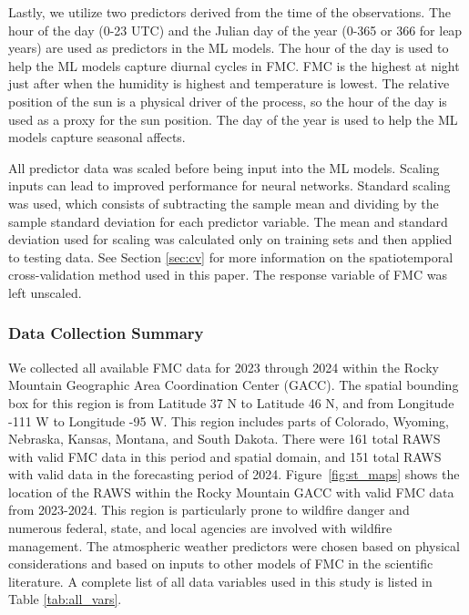 \documentclass[fire,article,submit,pdftex,moreauthors]{Definitions/mdpi}
\begin{document}
Lastly, we utilize two predictors derived from the time of the observations. The hour of the day (0-23 UTC) and the Julian day of the year (0-365 or 366 for leap years) are used as predictors in the ML models. The hour of the day is used to help the ML models capture diurnal cycles in FMC. FMC is the highest at night just after when the humidity is highest and temperature is lowest. The relative position of the sun is a physical driver of the process, so the hour of the day is used as a proxy for the sun position. The day of the year is used to help the ML models capture seasonal affects.

All predictor data was scaled before being input into the ML models. Scaling inputs can lead to improved performance for neural networks. Standard scaling was used, which consists of subtracting the sample mean and dividing by the sample standard deviation for each predictor variable. The mean and standard deviation used for scaling was calculated only on training sets and then applied to testing data. See Section \ref{sec:cv} for more information on the spatiotemporal cross-validation method used in this paper. The response variable of FMC was left unscaled.
\subsubsection{Data Collection Summary}
We collected all available FMC data for 2023 through 2024 within the Rocky Mountain Geographic Area Coordination Center (GACC). The spatial bounding box for this region is from Latitude 37 N to Latitude 46 N, and from Longitude -111 W to Longitude -95 W. This region includes parts of Colorado, Wyoming, Nebraska, Kansas, Montana, and South Dakota. There were 161 total RAWS with valid FMC data in this period and spatial domain, and 151 total RAWS with valid data in the forecasting period of 2024. Figure~\ref{fig:st_maps} shows the location of the RAWS within the Rocky Mountain GACC with valid FMC data from 2023-2024. This region is particularly prone to wildfire danger and numerous federal, state, and local agencies are involved with wildfire management. The atmospheric weather predictors were chosen based on physical considerations and based on inputs to other models of FMC in the scientific literature. A complete list of all data variables used in this study is listed in Table \ref{tab:all_vars}.
\end{document}
